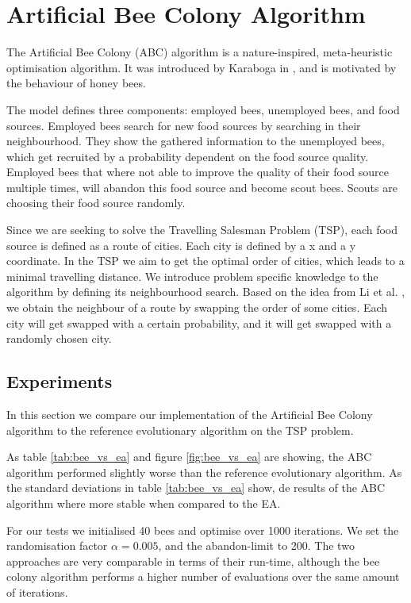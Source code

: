 \section{Artificial Bee Colony Algorithm}

The Artificial Bee Colony (ABC) algorithm is a nature-inspired, meta-heuristic optimisation
algorithm. It was introduced by Karaboga in \cite{beecolony}, and is motivated by the behaviour of honey bees.

The model defines three components: employed bees, unemployed bees, and food sources. Employed bees search for new food sources by searching in their neighbourhood. They show the gathered information to the unemployed bees, which get recruited by a probability dependent on the food source quality. Employed bees that where not able to improve the quality of their food source multiple times, will abandon this food source and become scout bees. Scouts are choosing their food source randomly.

Since we are seeking to solve the Travelling Salesman Problem (TSP), each food source is defined as a route of cities. Each city is defined by a x and a y coordinate. In the TSP we aim to get the optimal order of cities, which leads to a minimal travelling distance. We introduce problem specific knowledge to the algorithm by defining its neighbourhood search. Based on the idea from Li et al. \cite{beetsp}, we obtain the neighbour of a route by swapping the order of some cities. Each city will get swapped with a certain probability, and it will get swapped with a randomly chosen city.


\subsection{Experiments}

In this section we compare our implementation of the Artificial Bee Colony algorithm to the
reference evolutionary algorithm on the TSP problem.

As table \ref{tab:bee_vs_ea} and figure \ref{fig:bee_vs_ea} are showing, the ABC algorithm performed slightly worse than the reference evolutionary algorithm. As the standard deviations in table \ref{tab:bee_vs_ea} show, de results of the ABC algorithm where more stable when compared to the EA. 

For our tests we initialised 40 bees and optimise over 1000 iterations. We set the randomisation factor $\alpha = 0.005$, and the abandon-limit to 200.
The two approaches are very comparable in terms of their run-time, although the bee colony algorithm performs a higher number of evaluations over the same amount of iterations.

